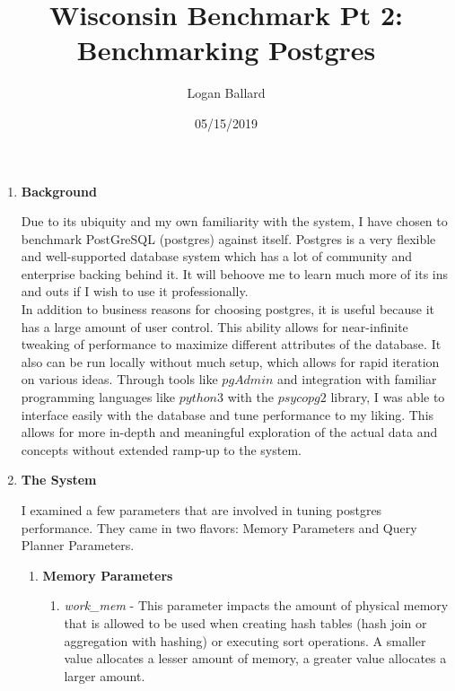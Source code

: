 \documentclass[11pt,letterpaper]{article}
\author{Logan Ballard}
\title{Wisconsin Benchmark Pt 2: Benchmarking Postgres}
\date{05/15/2019}
\begin{document}
\maketitle

\begin{enumerate}
	
\item \textbf{Background}

Due to its ubiquity and my own familiarity with the system, I have chosen to benchmark PostGreSQL (postgres) against itself.   Postgres is a very flexible and well-supported database system which has a lot of community and enterprise backing behind it.  It will behoove me to learn much more of its ins and outs if I wish to use it professionally.\\

In addition to business reasons for choosing postgres, it is useful because it has a large amount of user control.  This ability allows for near-infinite tweaking of performance to maximize different attributes of the database.  It also can be run locally without much setup, which allows for rapid iteration on various ideas.  Through tools like $pgAdmin$ and integration with familiar programming languages like $python3$ with the $psycopg2$ library, I was able to interface easily with the database and tune performance to my liking.  This allows for more in-depth and meaningful exploration of the actual data and concepts without extended ramp-up to the system.

\item \textbf{The System}

I examined a few parameters that are involved in tuning postgres performance.  They came in two flavors: Memory Parameters and Query Planner Parameters.

\begin{enumerate}{}
	\item \textbf{Memory Parameters}
	
	\begin{enumerate}
		
		\item \textit{work\_mem} - This parameter impacts the amount of physical memory that is allowed to be used when creating hash tables (hash join or aggregation with hashing) or executing sort operations.  A smaller value allocates a lesser amount of memory, a greater value allocates a larger amount.
		
	\end{enumerate}
	

\end{enumerate}
\end{enumerate}
\end{document}
